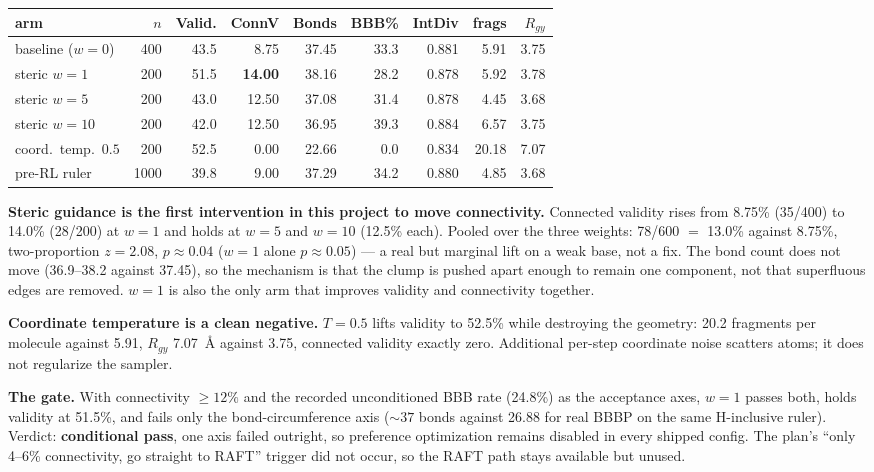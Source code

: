\documentclass[12pt, a4paper]{article}
\begin{document}
\begin{center}
\begin{tabular}{lrrrrrrrr}
\toprule
\textbf{arm} & $n$ & \textbf{Valid.} & \textbf{ConnV} & \textbf{Bonds} & \textbf{BBB\%} & \textbf{IntDiv} & \textbf{frags} & $R_{gy}$ \\
\midrule
baseline ($w{=}0$)          & 400  & 43.5 & 8.75  & 37.45 & 33.3 & 0.881 & 5.91 & 3.75 \\
steric $w{=}1$              & 200  & 51.5 & \textbf{14.00} & 38.16 & 28.2 & 0.878 & 5.92 & 3.78 \\
steric $w{=}5$              & 200  & 43.0 & 12.50 & 37.08 & 31.4 & 0.878 & 4.45 & 3.68 \\
steric $w{=}10$             & 200  & 42.0 & 12.50 & 36.95 & 39.3 & 0.884 & 6.57 & 3.75 \\
coord.\ temp.\ $0.5$        & 200  & 52.5 & 0.00  & 22.66 & 0.0  & 0.834 & 20.18 & 7.07 \\
pre-RL ruler                & 1000 & 39.8 & 9.00  & 37.29 & 34.2 & 0.880 & 4.85 & 3.68 \\
\bottomrule
\end{tabular}
\end{center}

\textbf{Steric guidance is the first intervention in this project to move
connectivity.} Connected validity rises from 8.75\% (35/400) to 14.0\%
(28/200) at $w{=}1$ and holds at $w{=}5$ and $w{=}10$ (12.5\% each). Pooled
over the three weights: 78/600 $=$ 13.0\% against 8.75\%,
two-proportion $z = 2.08$, $p \approx 0.04$ ($w{=}1$ alone $p \approx 0.05$)
--- a real but marginal lift on a weak base, not a fix. The bond count does
not move (36.9--38.2 against 37.45), so the mechanism is that the clump is
pushed apart enough to remain one component, not that superfluous edges are
removed. $w{=}1$ is also the only arm that improves validity and connectivity
together.

\textbf{Coordinate temperature is a clean negative.} $T = 0.5$ lifts validity
to 52.5\% while destroying the geometry: 20.2 fragments per molecule against
5.91, $R_{gy}$ 7.07~\AA{} against 3.75, connected validity exactly zero.
Additional per-step coordinate noise scatters atoms; it does not regularize
the sampler.

\textbf{The gate.} With connectivity $\geq 12\%$ and the recorded
unconditioned BBB rate (24.8\%) as the acceptance axes, $w{=}1$ passes both,
holds validity at 51.5\%, and fails only the bond-circumference axis
(${\sim}37$ bonds against 26.88 for real BBBP on the same H-inclusive ruler).
Verdict: \textbf{conditional pass}, one axis failed outright, so preference
optimization remains disabled in every shipped config. The plan's
``only 4--6\% connectivity, go straight to RAFT'' trigger did not occur, so
the RAFT path stays available but unused.
\end{document}
